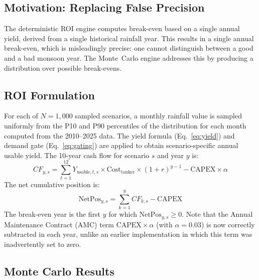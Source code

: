 \documentclass[conference]{IEEEtran}
\begin{document}
\subsection{Motivation: Replacing False Precision}

The deterministic ROI engine computes break-even based on a single
annual yield, derived from a single historical rainfall year. This results
in a single annual break-even, which is misleadingly precise: one
cannot distinguish between a good and a bad monsoon year. The Monte~Carlo
engine addresses this by producing a distribution over possible break-evens.

\subsection{ROI Formulation}

For each of $N = 1{,}000$ sampled scenarios, a monthly rainfall value is sampled
uniformly from the P10 and P90 percentiles of the distribution for each month
computed from the 2010--2025 data. The yield formula
(Eq.~\ref{eq:yield}) and demand gate (Eq.~\ref{eq:gating}) are applied to
obtain scenario-specific annual usable yield. The 10-year cash flow for
scenario $s$ and year $y$ is:
\begin{equation}
  CF_{y,s} = \sum_{t=1}^{12} Y_{\text{usable},t,s}
             \times \text{Cost}_{\text{tanker}}
             \times (1+r)^{y-1}
             - \text{CAPEX} \times \alpha
  \label{eq:cashflow}
\end{equation}
The net cumulative position is:
\begin{equation}
  \text{NetPos}_{y,s} = \sum_{k=1}^{y} CF_{k,s} - \text{CAPEX}
  \label{eq:netpos}
\end{equation}
The break-even year is the first $y$ for which $\text{NetPos}_{y,s} \geq 0$.
Note that the Annual Maintenance Contract (AMC) term $\text{CAPEX} \times
\alpha$ (with $\alpha = 0.03$) is now correctly subtracted in each year,
unlike an earlier implementation in which this term was inadvertently set
to zero.

\subsection{Monte Carlo Results}
\end{document}
